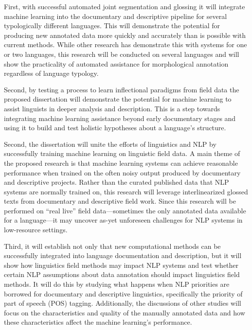 First, with successful automated joint segmentation and glossing it will integrate machine learning into the documentary and descriptive pipeline for several typologically different languages. This will demonstrate the potential for producing new annotated data more quickly and accurately than is possible with current methods. While other research has demonstrate this with systems for one or two languages, this research will be conducted on several languages and will show the practicality of automated assistance for morphological annotation regardless of language typology. 

Second, by testing a process to learn inflectional paradigms from field data the proposed dissertation will demonstrate the potential for machine learning to assist linguists in deeper analysis and description. This is a step towards integrating machine learning assistance beyond early documentary stages and using it to build and test holistic hypotheses about a language's structure.

Second, the dissertation will unite the efforts of linguistics and NLP by successfully training machine learning on linguistic field data. A main theme of the proposed research is that machine learning systems can achieve reasonable performance when trained on the often noisy output produced by documentary and descriptive projects. Rather than the curated published data that NLP systems are normally trained on, this research will leverage interlinearized glossed texts from documentary and descriptive field work. Since this research will be performed on ``real live” field data---sometimes the only annotated data available for a language---it may uncover as-yet unforeseen challenges for NLP systems in low-resource settings.

Third, it will establish not only that new computational methods can be successfully integrated into language documentation and description, but it will show how linguistics field methods may impact NLP systems and test whether certain NLP assumptions about data annotation should impact linguistics field methods. It will do this by studying what happens when NLP priorities are borrowed for documentary and descriptive linguistics, specifically the priority of part of speech (POS) tagging. Additionally, the discussions of other studies will focus on the characteristics and quality of the manually annotated data and how these characteristics affect the machine learning's performance.

